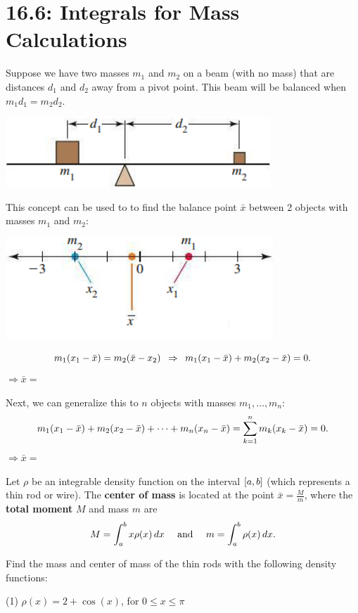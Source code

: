 \documentclass[../mathNotesPreamble]{subfiles}
\begin{document}
\section{16.6: Integrals for Mass Calculations}
  Suppose we have two masses $m_1$ and $m_2$ on a beam (with no mass) that are distances $d_1$ and $d_2$ away from a pivot point. This beam will be balanced when $m_1d_1=m_2d_2$.
  \vspace*{10pt}
  \begin{center}
    \includegraphics[width=0.45\linewidth]{../images/briggs_16_06/fig16_64}
  \end{center}
  \vspace*{10pt}
  This concept can be used to to find the balance point $\bar{x}$ between 2 objects with masses $m_1$ and $m_2$:
  \begin{center}
    \includegraphics[width=0.45\linewidth]{../images/briggs_16_06/fig16_65}
  \end{center}
  \[m_1{\left(x_1-\bar{x}\right)}=m_2{\left(\bar{x}-x_2\right)}\hspace*{5pt} \Rightarrow \hspace*{5pt} m_1{\left(x_1-\bar{x}\right)}+m_2{\left(x_2-\bar{x}\right)}=0.\]
  \tab$\Rightarrow \bar{x}=$

  Next, we can generalize this to $n$ objects with masses $m_1,\dots,m_n$:
    \[m_1{\left(x_1-\bar{x}\right)}+m_2{\left(x_2-\bar{x}\right)}+\dots+m_n{\left(x_n-\bar{x}\right)}=\sum_{k=1}^n m_k{\left(x_k-\bar{x}\right)}=0.\]
  \tab$\Rightarrow \bar{x}=$
  \pagebreak


  \begin{defn*}
    Let $\rho$ be an integrable density function on the interval ${\left[a,b\right]}$ (which represents a thin rod or wire). The \textbf{center of mass} is located at the point $\bar{x}=\frac{M}{m}$, where the \textbf{total moment} $M$ and mass $m$ are
      \[M=\int_a^b x\rho(x)\,dx\quad \textnormal{ and }\quad m=\int_a^b \rho(x)\,dx.\]
  \end{defn*}
  \begin{ex*}
    Find the mass and center of mass of the thin rods with the following density functions:
  \end{ex*}
  \begin{tasks}[after-item-skip=\stretch{1}, label=](1)
    \task 
      $\rho(x)=2+\cos(x)$, for $0\leq x\leq \pi$
  \end{tasks}
  \pagebreak
\end{document}
